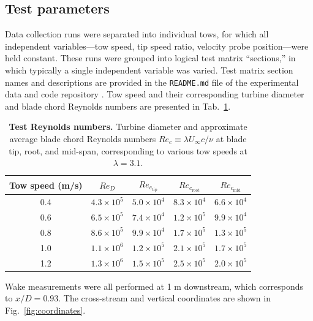 \documentclass[10pt,letterpaper]{article}
\begin{document}
\subsection*{Test parameters}

Data collection runs were separated into individual tows, for which all
independent variables---tow speed, tip speed ratio, velocity probe
position---were held constant. These runs were grouped into logical test matrix
``sections,'' in which typically a single independent variable was varied. Test
matrix section names and descriptions are provided in the \texttt{README.md}
file of the experimental data and code repository \cite{Bachant2015-RM2-data}.
Tow speed and their corresponding turbine diameter and blade chord Reynolds
numbers are presented in Tab.~\ref{tab:re}.

\begin{table}[ht]
\centering
\begin{tabular}{c|c|c|c|c}
Tow speed (m/s) & $Re_D$ & $Re_{c_\mathrm{tip}}$ & $Re_{c_\mathrm{root}}$ & $Re_{c_\mathrm{mid}}$\\
\hline
0.4 & $4.3 \times 10^5$ & $5.0 \times 10^4$ & $8.3 \times 10^4$ & $6.6 \times 10^4$ \\
0.6 & $6.5 \times 10^5$ & $7.4 \times 10^4$ & $1.2 \times 10^5$ & $9.9 \times 10^4$ \\
0.8 & $8.6 \times 10^5$ & $9.9 \times 10^4$ & $1.7 \times 10^5$ & $1.3 \times 10^5$ \\
1.0 & $1.1 \times 10^6$ & $1.2 \times 10^5$ & $2.1 \times 10^5$ & $1.7 \times 10^5$ \\
1.2 & $1.3 \times 10^6$ & $1.5 \times 10^5$ & $2.5 \times 10^5$ & $2.0 \times 10^5$ \\
\end{tabular}

\caption{{\bf Test Reynolds numbers.} Turbine diameter and approximate average
blade chord Reynolds numbers $Re_c \equiv \lambda U_\infty c / \nu$ at blade
tip, root, and mid-span, corresponding to various tow speeds at $\lambda=3.1$.}

\label{tab:re}
\end{table}

Wake measurements were all performed at 1 m downstream, which corresponds to
$x/D = 0.93$. The cross-stream and vertical coordinates are shown in
Fig.~\ref{fig:coordinates}.
\end{document}
